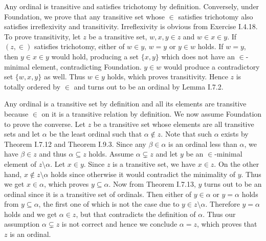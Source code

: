\documentclass[12pt]{article}
\theoremstyle{definition}
\newenvironment{customthm}[1]
  {\renewcommand\theinnercustomthm{#1}\innercustomthm}
  {\endinnercustomthm}
\begin{document}
\begin{customthm}{I.7.25}
  Any ordinal is transitive and satisfies trichotomy by definition. Conversely, under Foundation, we prove that any transitive set whose $\in$ satisfies trichotomy also satisfies irreflexivity and transitivity. Irreflexivity is obvious from Exercise I.4.18. To prove transitivity, let $z$ be a transitive set, $w,x,y\in z$ and $w\in x\in y$. If $(z,\in)$ satisfies trichotomy, either of $w\in y$, $w=y$ or $y\in w$ holds. If $w=y$, then $y\in x\in y$ would hold, producing a set $\{x,y\}$ which does not have an $\in$-minimal element, contradicting Foundation. $y\in w$ would produce a contradictory set $\{w,x,y\}$ as well. Thus $w\in y$ holds, which proves transitivity. Hence $z$ is totally ordered by $\in$ and turns out to be an ordinal by Lemma I.7.2.
\end{customthm}

\begin{customthm}{I.7.26}
  Any ordinal is a transitive set by definition and all its elements are transitive because $\in$ on it is a transitive relation by definition. We now assume Foundation to prove the converse. Let $z$ be a transitive set whose elements are all transitive sets and let $\alpha$ be the least ordinal such that $\alpha\notin z$. Note that such $\alpha$ exists by Theorem I.7.12 and Theorem I.9.3. Since any $\beta\in\alpha$ is an ordinal less than $\alpha$, we have $\beta\in z$ and thus $\alpha\subseteq z$ holds. Assume $\alpha\subsetneq z$ and let $y$ be an $\in$-minimal element of $z\setminus\alpha$. Let $x\in y$. Since $z$ is a transitive set, we have $x\in z$. On the other hand, $x\notin z\setminus\alpha$ holds since otherwise it would contradict the minimality of $y$. Thus we get $x\in\alpha$, which proves $y\subseteq\alpha$. Now from Theorem I.7.13, $y$ turns out to be an ordinal since it is a transitive set of ordinals. Then either of $y\in\alpha$ or $y=\alpha$ holds from $y\subseteq\alpha$, the first one of which is not the case due to $y\in z\setminus\alpha$. Therefore $y=\alpha$ holds and we get $\alpha\in z$, but that contradicts the definition of $\alpha$. Thus our assumption $\alpha\subsetneq z$ is not correct and hence we conclude $\alpha=z$, which proves that $z$ is an ordinal.
\end{customthm}
\end{document}
